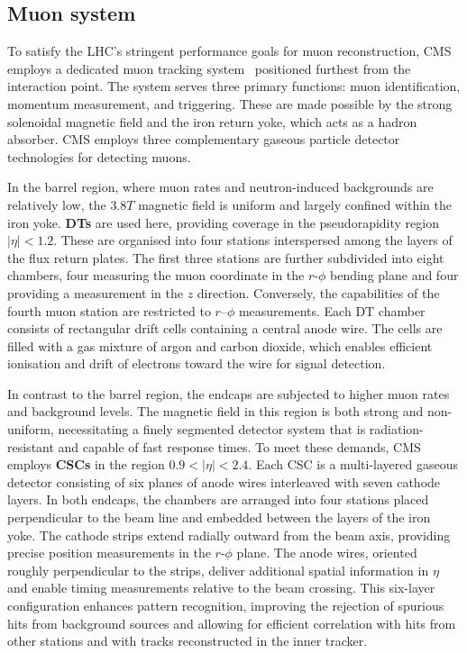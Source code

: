 \subsection{Muon system}
To satisfy the \ac{LHC}’s stringent performance goals for muon reconstruction, \ac{CMS} employs a dedicated muon tracking system~\cite{LHC_CMS,CMS_Muon_System_Performance} positioned furthest from the interaction point. The system serves three primary functions: muon identification, momentum measurement, and triggering. These are made possible by the strong solenoidal magnetic field and the iron return yoke, which acts as a hadron absorber.  \ac{CMS} employs three complementary gaseous particle detector technologies for detecting muons.  

In the barrel region, where muon rates and neutron-induced backgrounds are relatively low, the $3.8\unit{T}$ magnetic field is uniform and largely confined within the iron yoke. \textbf{\acp{DT}} are used here, providing coverage in the pseudorapidity region $|\eta| < 1.2$. These are organised into four stations interspersed among the layers of the flux return plates. The first three stations are further subdivided into eight chambers, four measuring the muon coordinate in the $r$-$\phi$ bending plane and four providing a measurement in the $z$ direction. Conversely, the capabilities of the fourth muon station are restricted to $r$–$\phi$ measurements. Each \ac{DT} chamber consists of rectangular drift cells containing a central anode wire. The cells are filled with a gas mixture of argon and carbon dioxide, which enables efficient ionisation and drift of electrons toward the wire for signal detection. 

In contrast to the barrel region, the endcaps are subjected to higher muon rates and background levels. The magnetic field in this region is both strong and non-uniform, necessitating a finely segmented detector system that is radiation-resistant and capable of fast response times. To meet these demands, \ac{CMS} employs \textbf{\acp{CSC}} in the region $0.9 < |\eta|<2.4$. Each \ac{CSC} is a multi-layered gaseous detector consisting of six planes of anode wires interleaved with seven cathode layers. In both endcaps, the chambers are arranged into four stations placed perpendicular to the beam line and embedded between the layers of the iron yoke. The cathode strips extend radially outward from the beam axis, providing precise position measurements in the $r$-$\phi$ plane. The anode wires, oriented roughly perpendicular to the strips, deliver additional spatial information in $\eta$ and enable timing measurements relative to the beam crossing. This six-layer configuration enhances pattern recognition, improving the rejection of spurious hits from background sources and allowing for efficient correlation with hits from other stations and with tracks reconstructed in the inner tracker.

